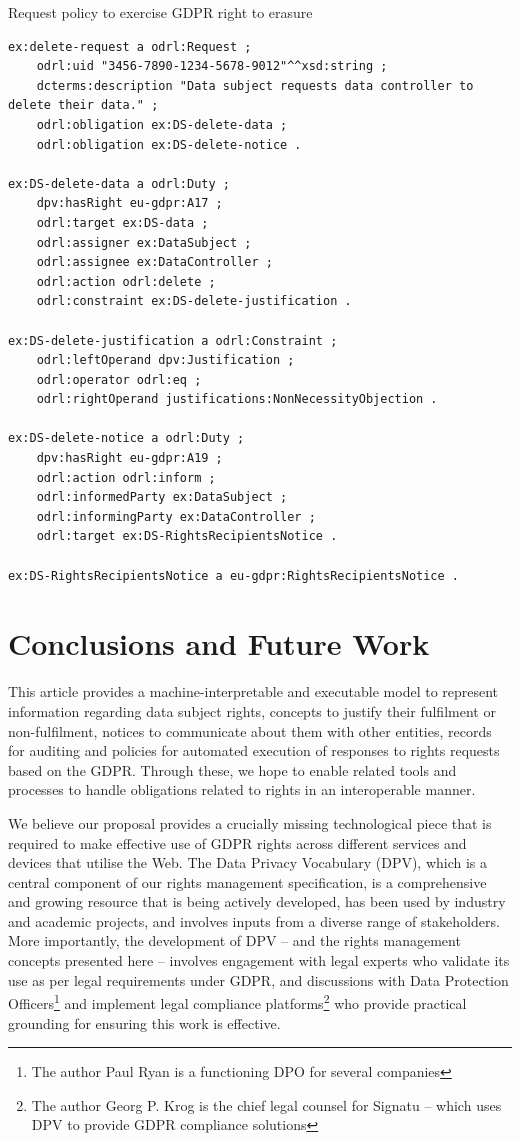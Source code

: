 \documentclass{IOS-Book-Article}     %
\begin{document}
\begin{listing}[ht]
\caption{Request policy to exercise GDPR right to erasure}
\label{lst:policy}
\begin{verbatim}
ex:delete-request a odrl:Request ;
    odrl:uid "3456-7890-1234-5678-9012"^^xsd:string ;
    dcterms:description "Data subject requests data controller to delete their data." ;
    odrl:obligation ex:DS-delete-data ;
    odrl:obligation ex:DS-delete-notice .

ex:DS-delete-data a odrl:Duty ;
    dpv:hasRight eu-gdpr:A17 ;
    odrl:target ex:DS-data ;
    odrl:assigner ex:DataSubject ;
    odrl:assignee ex:DataController ;
    odrl:action odrl:delete ;
    odrl:constraint ex:DS-delete-justification .

ex:DS-delete-justification a odrl:Constraint ;
    odrl:leftOperand dpv:Justification ;
    odrl:operator odrl:eq ;
    odrl:rightOperand justifications:NonNecessityObjection .

ex:DS-delete-notice a odrl:Duty ;
    dpv:hasRight eu-gdpr:A19 ;
    odrl:action odrl:inform ;
    odrl:informedParty ex:DataSubject ;
    odrl:informingParty ex:DataController ;
    odrl:target ex:DS-RightsRecipientsNotice .

ex:DS-RightsRecipientsNotice a eu-gdpr:RightsRecipientsNotice .
\end{verbatim}
\end{listing}

\section{Conclusions and Future Work}
\label{sec:conclusions}

This article provides a machine-interpretable and executable model to represent information regarding data subject rights, concepts to justify their fulfilment or non-fulfilment, notices to communicate about them with other entities, records for auditing and policies for automated execution of responses to rights requests based on the GDPR. Through these, we hope to enable related tools and processes to handle obligations related to rights in an interoperable manner.

We believe our proposal provides a crucially missing technological piece that is required to make effective use of GDPR rights across different services and devices that utilise the Web. The Data Privacy Vocabulary (DPV), which is a central component of our rights management specification, is a comprehensive and growing resource that is being actively developed, has been used by industry and academic projects, and involves inputs from a diverse range of stakeholders. More importantly, the development of DPV -- and the rights management concepts presented here -- involves engagement with legal experts who validate its use as per legal requirements under GDPR, and discussions with Data Protection Officers\footnote{The author Paul Ryan is a functioning DPO for several companies} and implement legal compliance platforms\footnote{The author Georg P. Krog is the chief legal counsel for Signatu -- which uses DPV to provide GDPR compliance solutions} who provide practical grounding for ensuring this work is effective.
\end{document}
